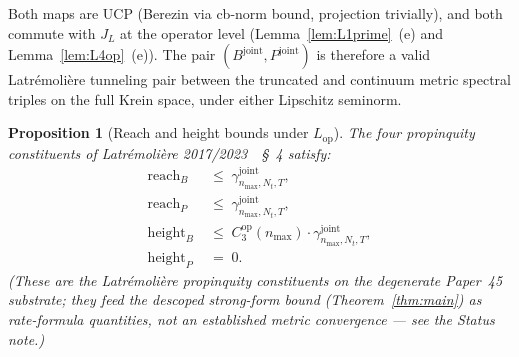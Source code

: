 \documentclass[11pt,a4paper]{article}
\theoremstyle{plain}
\newtheorem{proposition}[theorem]{Proposition}
\theoremstyle{definition}
\newcommand{\nmax}{n_{\max}}
\newcommand{\Nt}{N_{t}}
\newcommand{\JL}{J_{L}}
\newcommand{\Lop}{L_{\mathrm{op}}}
\newcommand{\Bjoint}{B^{\mathrm{joint}}}
\newcommand{\Pjoint}{P^{\mathrm{joint}}}
\newcommand{\gammajoint}{\gamma^{\mathrm{joint}}}
\newcommand{\Cthreeop}{C_{3}^{\mathrm{op}}}
\begin{document}
Both maps are UCP (Berezin via cb-norm bound, projection trivially),
and both commute with $\JL$ at the operator level
(Lemma~\ref{lem:L1prime}~(e) and Lemma~\ref{lem:L4op}~(e)). The pair
$(\Bjoint, \Pjoint)$ is therefore a valid Latr\'emoli\`ere tunneling
pair between the truncated and continuum metric spectral triples on
the full Krein space, under either Lipschitz seminorm.

\begin{proposition}[Reach and height bounds under $\Lop$]\label{prop:reach_height_op}
The four propinquity constituents of Latr\'emoli\`ere
2017/2023~\cite{latremoliere_metric_st_2017}~\S~4 satisfy:
\begin{align}
   \mathrm{reach}_{B} &\;\le\; \gammajoint_{\nmax, \Nt, T},
   \label{eq:reach_B_op} \\
   \mathrm{reach}_{P} &\;\le\; \gammajoint_{\nmax, \Nt, T},
   \label{eq:reach_P_op} \\
   \mathrm{height}_{B} &\;\le\; \Cthreeop(\nmax) \cdot \gammajoint_{\nmax, \Nt, T},
   \label{eq:height_B_op} \\
   \mathrm{height}_{P} &\;=\; 0.
   \label{eq:height_P_op}
\end{align}
\emph{(These are the Latr\'emoli\`ere propinquity constituents on the
degenerate Paper~45 substrate; they feed the descoped strong-form bound
(Theorem~\ref{thm:main}) as rate-formula quantities, not an established
metric convergence --- see the Status note.)}
\end{proposition}
\end{document}
